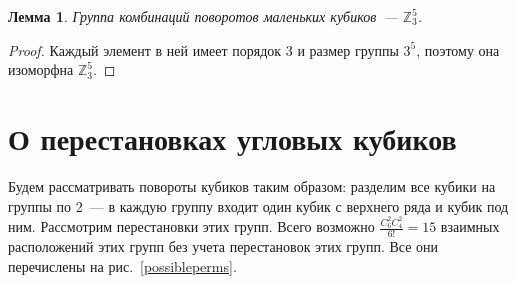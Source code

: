 \documentclass[utf8,a4paper,draft]{article}
\newtheorem{lemma_cub1}{Лемма}
\begin{document}
\begin{lemma_cub1}
Группа комбинаций поворотов маленьких кубиков~--- $\mathbb{Z}_3^5$.
\end{lemma_cub1}
\begin{proof}
    Каждый элемент в ней имеет порядок 3 и размер группы $3^5$, поэтому она изоморфна $\mathbb{Z}_3^5$.
\end{proof}
\section{О перестановках угловых кубиков}
Будем рассматривать повороты кубиков таким образом: разделим все кубики на группы по 2~--- в каждую группу входит один кубик с верхнего ряда и кубик под ним. Рассмотрим перестановки этих групп. Всего возможно $\frac{C^2_6C^2_4}{6!}=15$ взаимных расположений этих групп без учета перестановок этих групп. Все они перечислены на рис.~\ref{possibleperms}.
\end{document}
